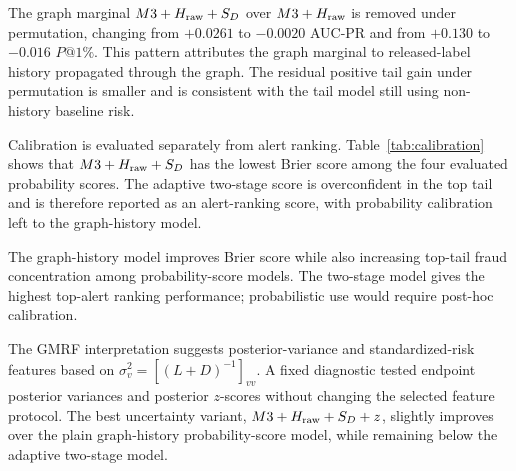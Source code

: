 \documentclass[11pt]{article}
\theoremstyle{definition}
\theoremstyle{remark}
\begin{document}
The graph marginal $M3+H_{\rm raw}+S_D$ over $M3+H_{\rm raw}$ is removed under permutation, changing from $+0.0261$ to $-0.0020$ AUC-PR and from $+0.130$ to $-0.016$ $P@1\%$. This pattern attributes the graph marginal to released-label history propagated through the graph. The residual positive tail gain under permutation is smaller and is consistent with the tail model still using non-history baseline risk.

Calibration is evaluated separately from alert ranking. Table~\ref{tab:calibration} shows that $M3+H_{\rm raw}+S_D$ has the lowest Brier score among the four evaluated probability scores. The adaptive two-stage score is overconfident in the top tail and is therefore reported as an alert-ranking score, with probability calibration left to the graph-history model.

\begin{table}[h]
\centering
\caption{Mean calibration diagnostics over five block-causal windows.}
\label{tab:calibration}
\end{table}

The graph-history model improves Brier score while also increasing top-tail fraud concentration among probability-score models. The two-stage model gives the highest top-alert ranking performance; probabilistic use would require post-hoc calibration.

The GMRF interpretation suggests posterior-variance and standardized-risk features based on $\sigma_v^2=[(L+D)^{-1}]_{vv}$. A fixed diagnostic tested endpoint posterior variances and posterior $z$-scores without changing the selected feature protocol. The best uncertainty variant, $M3+H_{\rm raw}+S_D+z$, slightly improves over the plain graph-history probability-score model, while remaining below the adaptive two-stage model.
\end{document}
